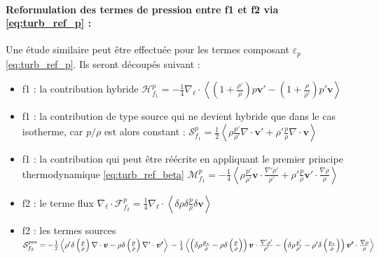 \paragraph{Reformulation des termes de pression entre f1 et f2 via \eqref{eq:turb_ref_p} :}
Une étude similaire peut être effectuée pour les termes composant $\varepsilon_{p}$ \eqref{eq:turb_ref_p}. 
Ils seront découpés suivant : 
\begin{itemize}
    \item f1 : la contribution hybride $\mathcal{H}^{p}_{f_1} = - \frac{1}{4} \nabla_{\boldsymbol{\ell}} \cdot \left<\left(1+\frac{\rho'}{\rho}\right) p \boldsymbol{v'} - \left(1+\frac{\rho}{\rho'}\right)p'\boldsymbol{v} \right>$
    \item f1 : la contribution de type source qui ne devient hybride que dans le cas isotherme, car $p/\rho$ est alors constant : 
        $\mathcal{S}^{p}_{f_1} =  \frac{1}{2} \left<\rho  \frac{p'}{\rho'} \nabla \cdot \boldsymbol{v'} + \rho' \frac{p}{\rho} \nabla \cdot \boldsymbol{v}\right>$
    \item f1 : la contribution qui peut être réécrite en appliquant le premier principe thermodynamique \eqref{eq:turb_ref_beta} $\mathcal{M}^{p}_{f_1} =  -\frac{1}{4} \left<\rho \frac{p'}{\rho'} \boldsymbol{v} \cdot \frac{\nabla'\rho'}{\rho'} + \rho' \frac{p}{\rho} \boldsymbol{v'} \cdot \frac{\nabla\rho}{\rho}  \right> $
    \item f2 : le terme flux $\nabla_{\boldsymbol{\ell}} \cdot \mathcal{F}^{p}_{f_2} = \frac{1}{4} \nabla_{\boldsymbol{\ell}} \cdot\left<\delta \rho  \delta \frac{p}{\rho} \delta \boldsymbol{v}\right> $ 
    \item f2 : les termes sources $\mathcal{S}^{pm}_{f_2} =  - \frac{1}{2}  \left<  \rho' \delta \left(\frac{p}{\rho}\right) \nabla \cdot \boldsymbol{v} -   \rho \delta \left(\frac{p}{\rho}\right) \nabla' \cdot \boldsymbol{v'} \right>\\-\frac{1}{4} \left<\left(\delta \rho \frac{p_*}{\rho} - \rho \delta \left(\frac{p}{\rho}\right)\right)\boldsymbol{v} \cdot \frac{\nabla' \rho'}{\rho'} - \left(\delta \rho \frac{p'}{\rho'} - \rho' \delta \left(\frac{p_*}{\rho}\right)\right)\boldsymbol{v'} \cdot \frac{\nabla \rho}{\rho}\right>$
\end{itemize}
